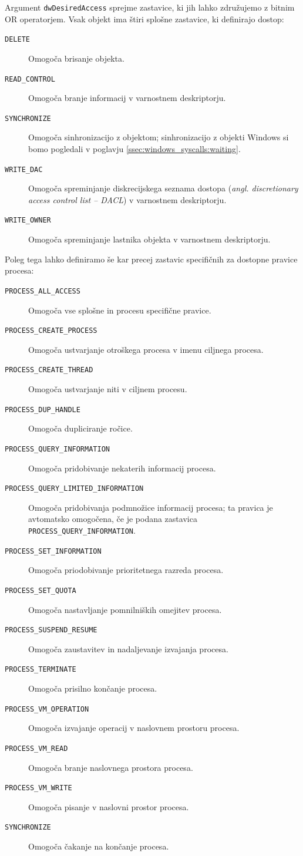 \documentclass[a4paper,12pt,openright]{book}
\begin{document}
Argument \texttt{dwDesiredAccess} sprejme zastavice, ki jih lahko združujemo z bitnim OR operatorjem.
Vsak objekt ima štiri splošne zastavice, ki definirajo dostop:
\begin{description}
	\item[\texttt{DELETE}] Omogoča brisanje objekta.
	\item[\texttt{READ\_CONTROL}] Omogoča branje informacij v varnostnem deskriptorju.
	\item[\texttt{SYNCHRONIZE}] Omogoča sinhronizacijo z objektom; sinhronizacijo z objekti Windows si bomo pogledali v poglavju \ref{ssec:windows_syscalls:waiting}.
	\item[\texttt{WRITE\_DAC}] Omogoča spreminjanje diskrecijskega seznama dostopa (\textit{angl. discretionary access control list -- DACL}) v varnostnem deskriptorju.
	\item[\texttt{WRITE\_OWNER}] Omogoča spreminjanje lastnika objekta v varnostnem deskriptorju.
\end{description}
Poleg tega lahko definiramo še kar precej zastavic specifičnih za dostopne pravice procesa:
\begin{description}
	\item[\texttt{PROCESS\_ALL\_ACCESS}] Omogoča vse splošne in procesu specifične pravice.
	\item[\texttt{PROCESS\_CREATE\_PROCESS}] Omogoča ustvarjanje otroškega procesa v imenu ciljnega procesa.
	\item[\texttt{PROCESS\_CREATE\_THREAD}] Omogoča ustvarjanje niti v ciljnem procesu.
	\item[\texttt{PROCESS\_DUP\_HANDLE}] Omogoča dupliciranje ročice.
	\item[\texttt{PROCESS\_QUERY\_INFORMATION}] Omogoča pridobivanje nekaterih informacij procesa.
	\item[\texttt{PROCESS\_QUERY\_LIMITED\_INFORMATION}] Omogoča pridobivanja podmnožice informacij procesa; ta pravica je avtomatsko omogočena, če je podana zastavica \texttt{PROCESS\_QUERY\_INFORMATION}.
	\item[\texttt{PROCESS\_SET\_INFORMATION}] Omogoča priodobivanje prioritetnega razreda procesa.
	\item[\texttt{PROCESS\_SET\_QUOTA}] Omogoča nastavljanje pomnilniških omejitev procesa.
	\item[\texttt{PROCESS\_SUSPEND\_RESUME}] Omogoča zaustavitev in nadaljevanje izvajanja procesa.
	\item[\texttt{PROCESS\_TERMINATE}] Omogoča prisilno končanje procesa.
	\item[\texttt{PROCESS\_VM\_OPERATION}] Omogoča izvajanje operacij v naslovnem prostoru procesa.
	\item[\texttt{PROCESS\_VM\_READ}] Omogoča branje naslovnega prostora procesa.
	\item[\texttt{PROCESS\_VM\_WRITE}] Omogoča pisanje v naslovni prostor procesa.
	\item[\texttt{SYNCHRONIZE}] Omogoča čakanje na končanje procesa.
\end{description}
\end{document}
